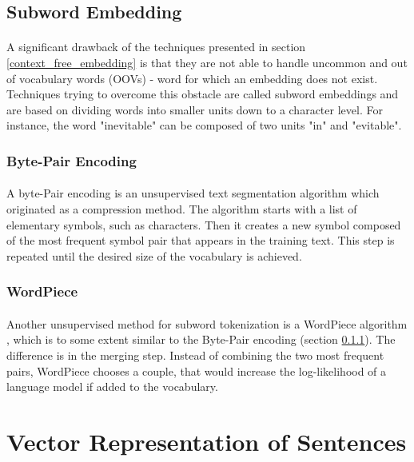 \subsection{Subword Embedding}\label{subword_models}
\paragraph{}
A significant drawback of the techniques presented in section \ref{context_free_embedding} is that they are not able to handle uncommon and out of vocabulary words (OOVs) - word for which an embedding does not exist. Techniques trying to overcome this obstacle are called subword embeddings and are based on dividing words into smaller units down to a character level. For instance, the word "inevitable" can be composed of two units "in" and "evitable".

\subsubsection{Byte-Pair Encoding}\label{BPE}
\paragraph{}
A byte-Pair encoding \cite{nlp_stanford} is an unsupervised text segmentation algorithm which originated as a compression method. The algorithm starts with a list of elementary symbols, such as characters. Then it creates a new symbol composed of the most frequent symbol pair that appears in the training text. This step is repeated until the desired size of the vocabulary is achieved.

\subsubsection{WordPiece}
\paragraph{}
Another unsupervised method for subword tokenization is a WordPiece algorithm \cite{nlp_stanford}, which is to some extent similar to the Byte-Pair encoding (section \ref{BPE}). The difference is in the merging step. Instead of combining the two most frequent pairs, WordPiece chooses a couple, that would increase the log-likelihood of a language model \cite{nlp_eisenstein} if added to the vocabulary.

\section{Vector Representation of Sentences}\label{vector_representation_of_sentences}
